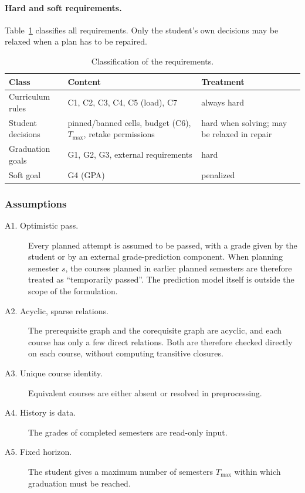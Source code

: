 \documentclass[10pt,a4paper]{article}
\begin{document}
\paragraph{Hard and soft requirements.}
Table~\ref{tab:classes} classifies all requirements. Only the student's own decisions may be relaxed when a plan has to be repaired.

\begin{table}[ht]
\centering
\small
\begin{tabular}{@{}p{3.3cm}p{5.2cm}p{4.6cm}@{}}
\toprule
\textbf{Class} & \textbf{Content} & \textbf{Treatment} \\
\midrule
Curriculum rules & C1, C2, C3, C4, C5 (load), C7 & always hard \\
Student decisions & pinned/banned cells, budget (C6), $T_{\max}$, retake permissions & hard when solving; may be relaxed in repair \\
Graduation goals & G1, G2, G3, external requirements & hard \\
Soft goal & G4 (GPA) & penalized \\
\bottomrule
\end{tabular}
\caption{Classification of the requirements.}
\label{tab:classes}
\end{table}

      \subsubsection{Assumptions}

\begin{description}
      \item[A1. Optimistic pass.] Every planned attempt is assumed to be passed, with a grade given by the student or by an external grade-prediction component. When planning semester $s$, the courses planned in earlier planned semesters are therefore treated as ``temporarily passed''. The prediction model itself is outside the scope of the formulation.
      \item[A2. Acyclic, sparse relations.] The prerequisite graph and the corequisite graph are acyclic, and each course has only a few direct relations. Both are therefore checked directly on each course, without computing transitive closures.
      \item[A3. Unique course identity.] Equivalent courses are either absent or resolved in preprocessing.
      \item[A4. History is data.] The grades of completed semesters are read-only input.
      \item[A5. Fixed horizon.] The student gives a maximum number of semesters $T_{\max}$ within which graduation must be reached.
\end{description}
\end{document}
